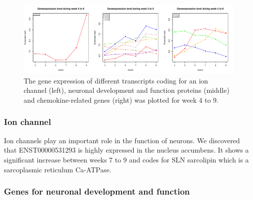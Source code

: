 \documentclass[
]{article}
\begin{document}
\begin{figure}
\centering
\includegraphics{final_report_files/figure-latex/gene-expression-brain-1.pdf}
\caption{\label{fig:gene-expression-brain} The gene expression of different transcripts coding for an ion channel (left), neuronal development and function proteins (middle) and chemokine-related genes (right) was plotted for week 4 to 9.}
\end{figure}

\hypertarget{ion-channel}{%
\subsubsection{Ion channel}\label{ion-channel}}

Ion channels play an important role in the function of neurons. We discovered that ENST00000531293 is highly expressed in the nucleus accumbens. It shows a significant increase between weeks 7 to 9 and codes for SLN sarcolipin which is a sarcoplasmic reticulum Ca-ATPase.

\hypertarget{genes-for-neuronal-development-and-function}{%
\subsubsection{Genes for neuronal development and function}\label{genes-for-neuronal-development-and-function}}
\end{document}
